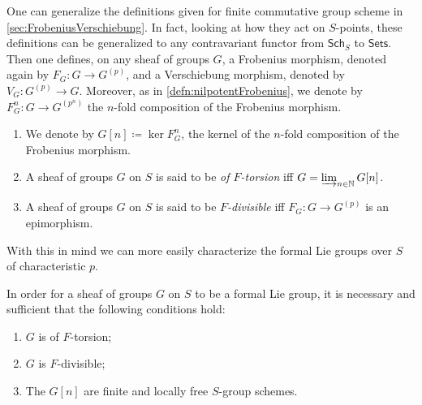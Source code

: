 \begin{rem}
One can generalize the definitions given for finite commutative group scheme
in \cref{sec:FrobeniusVerschiebung}.
In fact, looking at how they act on $S$-points, these
definitions can be generalized to any contravariant functor
from $\mathsf{Sch}_{ S }$ to $\mathsf{Sets}$.
Then one defines, on any sheaf of groups $G$, a Frobenius morphism,
denoted again by $F_G\colon G \to G^{(p)}$, 
and a Verschiebung morphism, denoted by $V_G \colon G^{(p)} \to G$.
Moreover, as in \cref{defn:nilpotentFrobenius}, we denote by
$F^n_G\colon G \to G^{(p^n)}$ the $n$-fold composition
of the Frobenius morphism.
\end{rem}


\begin{defn}[]\leavevmode\vspace{-.2\baselineskip}
\begin{enumerate}
\item We denote by $G[n] \coloneqq \ker F^n_G$, the kernel of the $n$-fold composition
	of the Frobenius morphism.

\item A sheaf of groups $G$ on $S$ is said to be {\em of $F$-torsion} iff
	$G = \varinjlim_{n \in \mathbb{N}} G[n]$.

\item A sheaf of groups $G$ on $S$ is said to be {\em $F$-divisible} iff
	$F_G\colon G \to G^{(p)}$ is an epimorphism.
\end{enumerate}
\end{defn}


\noindent
With this in mind we can more easily characterize the formal Lie groups over
$S$ of characteristic $p$.
\begin{thm}\label{thm:MessingCharactLieGroup}
	In order for a sheaf of groups $G$ on $S$ to be a formal Lie group,
	it is necessary and sufficient that the following conditions hold:
\begin{enumerate}
	\item $G$ is of $F$-torsion;
	\item $G$ is $F$-divisible;
	\item The $G[n]$ are finite and locally free $S$-group schemes.
\end{enumerate}
\end{thm}


